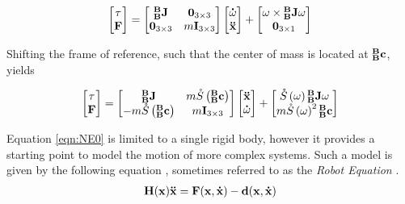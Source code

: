\begin{align}
    \begin{bmatrix}
    \tau \\ {\mathbf{F}}
    \end{bmatrix} = 
    \begin{bmatrix}
     {^\mathbf{B}_\mathbf{B}\mathbf{J}} & {\mathbf{0}}_{3 \times 3} \\
      {\mathbf{0}}_{3 \times 3} & m {\mathbf{I}}_{3 \times 3}
    \end{bmatrix}
    \begin{bmatrix}
     \mathbf{\dot{\omega}}\\
     {\mathbf{\Ddot{x}}}
    \end{bmatrix}
    + 
    \begin{bmatrix}
     \omega \times {^\mathbf{B}_\mathbf{B}\mathbf{J}}\omega\\
     {\mathbf{0}}_{3 \times 1} 
    \end{bmatrix}
\end{align}

\noindent Shifting the frame of reference, such that the center of mass is located at $^\mathbf{B}_\mathbf{B} \mathbf{c}$, yields

\begin{align} \label{eqn:NE0}
    \begin{bmatrix}
    \tau \\ {\mathbf{F}}
    \end{bmatrix} = 
    \begin{bmatrix}
     {^\mathbf{B}_\mathbf{B}\mathbf{J}} & m\mathring{S}\left(^\mathbf{B}_\mathbf{B}\mathbf{c}\right) \\
      -m\mathring{S}\left(^\mathbf{B}_\mathbf{B}\mathbf{c}\right) & m {\mathbf{I}}_{3 \times 3}
    \end{bmatrix}
    \begin{bmatrix}
     {\mathbf{\Ddot{x}}}\\
     \mathbf{\dot{\omega}}
    \end{bmatrix}
    + 
    \begin{bmatrix}
     \mathring{S}\left(\omega\right){^\mathbf{B}_\mathbf{B}\mathbf{J}}\omega \\
     m \mathring{S}\left(\omega\right)^2{^\mathbf{B}_\mathbf{B}\mathbf{c}}
    \end{bmatrix}
\end{align}


\noindent Equation \ref{eqn:NE0} is limited to a single rigid body, however it provides a starting point to model the motion of more complex systems. Such a model is given by the following equation \cite{asada_slotine_1986, tedrake}, sometimes referred to as the \textit{Robot Equation} \cite{isenberg_2020}.
\begin{align} \label{eqn:NE1}
    {\mathbf{H}}({\mathbf{{x}}}){\mathbf{\Ddot{x}}} = {\mathbf{F}}({\mathbf{{x}}}, {\mathbf{\dot{x}}}) - {\mathbf{d}}({\mathbf{{x}}}, {\mathbf{\dot{x}}})
\end{align}

